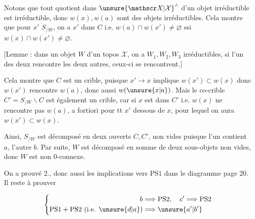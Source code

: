 Notons que tout quotient dans $\unsure{\mathscr X|\mathcal X}^{\wedge}$ d'un objet irréductible est irréductible, donc $w(x),w(a)$ sont des objets irréductibles. Cela montre que pour  $x'$  $S_{/W}$,  on a $x'$ dans $C$ i.e. $w(a)\cap w(x')\ne\varnothing$ ssi $w(x)\cap w(x')\ne\varnothing$.

[Lemme  : dans un objet  $W$ d'un topos $\mathscr X$,  on a   $W_1,W_2,W_3$ irréductibles, si l'un des deux rencontre les deux autres, ceux-ci se rencontrent.]

Cela montre que $C$ est un crible, puisque $x'\longrightarrow x$ implique $w(x')\subset w(x)$ donc $w(x')$ rencontre $w(a)$, donc aussi $w(\unsure{x|a})$. Mais  le co-crible $C'=S_{/W}\smallsetminus C$ est également un crible, car si $x$ est dans $C'$ i.e. $w(x)$ ne rencontre pas $w(a)$, a fortiori pour tt $x'$  dessous de $x$, pour lequel on aura $w(x')\subset w(x)$.

Ainsi, $S_{/W}$ est décomposé en  deux ouverts $C,C'$, non vides puisque l'un contient $a$, l'autre $b$. Par suite, $W$ est décomposé en somme de deux \inserted{$\ne$} sous-objets non vides, donc $W$ est non $0$-connexe.

On a prouvé 2., donc aussi  les implications vers $\mathrm{PS}1$ dans le diagramme page 20. Il reste à prouver

\[
\left\{\begin{aligned}
b&\Longrightarrow\mathrm{PS}2,\quad c'\Longrightarrow\mathrm{PS}2\\
\mathrm{PS}1+\mathrm{PS}2\ (\text{i.e. }\unsure{d|a})&\Longrightarrow\unsure{a'|b'}
\end{aligned}\right.
\]

